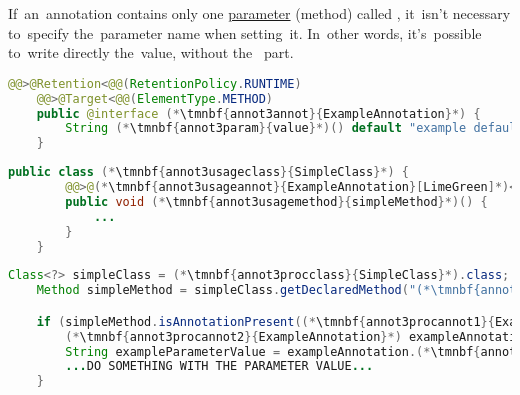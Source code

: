 \label{javaannotationparamvalue}
If~an~annotation contains only one \hyperref[parameterargument]{parameter} (method) called , it~isn't necessary to~specify the~parameter name when setting~it.
In~other words, it's~possible to~write directly the~value, without \mbox{the } part.

\example
\begin{lstlisting}[language=Java, title={Annotation with single parameter called \itq{value}}]
    @@>@Retention<@@(RetentionPolicy.RUNTIME)
    @@>@Target<@@(ElementType.METHOD)
    public @interface (*\tmnbf{annot3annot}{ExampleAnnotation}*) {
        String (*\tmnbf{annot3param}{value}*)() default "example default value";
    }
\end{lstlisting}
\begin{lstlisting}[language=Java, title={Setting the~parameter value~--~no~need to~write \mbitq{value = }}]
    public class (*\tmnbf{annot3usageclass}{SimpleClass}*) {
        @@>@(*\tmnbf{annot3usageannot}{ExampleAnnotation}[LimeGreen]*)<@@("new value")
        public void (*\tmnbf{annot3usagemethod}{simpleMethod}*)() {
            ...
        }
    }
\end{lstlisting}
\begin{lstlisting}[language=Java, title={Runtime annotation processing}]
    Class<?> simpleClass = (*\tmnbf{annot3procclass}{SimpleClass}*).class;
    Method simpleMethod = simpleClass.getDeclaredMethod("(*\tmnbf{annot3procmethod}{simpleMethod}[ForestGreen]*)");

    if (simpleMethod.isAnnotationPresent((*\tmnbf{annot3procannot1}{ExampleAnnotation}*).class)) {
        (*\tmnbf{annot3procannot2}{ExampleAnnotation}*) exampleAnnotation = simpleMethod.getAnnotation((*\tmnbf{annot3procannot3}{ExampleAnnotation}*).class);
        String exampleParameterValue = exampleAnnotation.(*\tmnbf{annot3procparam}{value}*)();
        ...DO SOMETHING WITH THE PARAMETER VALUE...
    }
\end{lstlisting}
\newpage

